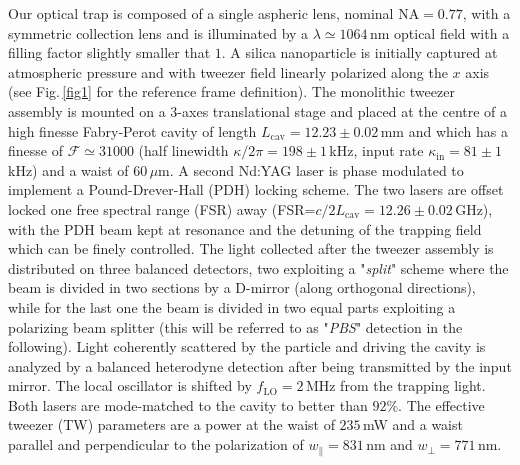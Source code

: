 \documentclass[aps,pra,twocolumn,nopacs,superscriptaddress,groupedaddress]{revtex4}
\begin{document}
Our optical trap is composed of a single aspheric lens, nominal NA$=0.77$, with a symmetric collection lens and is illuminated by a $\lambda\simeq 1064$\,nm optical field with a filling factor slightly smaller that $1$. A silica nanoparticle is initially captured at atmospheric pressure and with tweezer field linearly polarized along the $x$ axis (see Fig.\,\ref{fig1} for the reference frame definition). The monolithic tweezer assembly is mounted on a 3-axes translational stage and placed at the centre of a high finesse Fabry-Perot cavity of length $L_{\text{cav}}=12.23\pm0.02$\,mm and which has a finesse of $\mathcal{F} \simeq 31000$ (half linewidth $\kappa/2\pi=198\pm1$\,kHz, input rate $\kappa_{\text{in}}=81\pm1$\,kHz) and a waist of $60\,\mu$m. A second Nd:YAG laser is phase modulated to implement a Pound-Drever-Hall (PDH) locking scheme. The two lasers are offset locked one free spectral range (FSR) away (FSR=$c/2L_{\text{cav}}= 12.26\pm0.02$\,GHz), with the PDH beam kept at resonance and the detuning of the trapping field which can be finely controlled. The light collected after the tweezer assembly is distributed on three balanced detectors, two exploiting a "\textit{split}" scheme where the beam is divided in two sections by a D-mirror (along orthogonal directions), while for the last one the beam is divided in two equal parts exploiting a polarizing beam splitter (this will be referred to as "\textit{PBS}" detection in the following). Light coherently scattered by the particle and driving the cavity is analyzed by a balanced heterodyne detection after being transmitted by the input mirror. The local oscillator is shifted by $f_{\text{LO}}=2$\,MHz from the trapping light. Both lasers are mode-matched to the cavity to better than $92\%$. The effective tweezer (TW) parameters are a power at the waist of $235$\,mW and a waist parallel and perpendicular to the polarization of $w_{\parallel}=831$\,nm and $w_{\perp}=771$\,nm.
\end{document}
